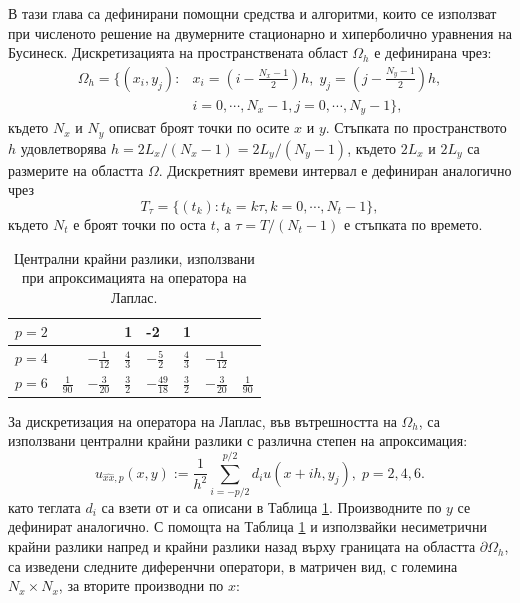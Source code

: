 \documentclass[a5paper]{article}
\newcommand{\be}{\begin{equation}}
\newcommand{\ee}{\end{equation}}
\theoremstyle{remark}
\begin{document}
\begin{large}
В тази глава са дефинирани помощни средства и алгоритми, които се използват при численото решение на двумерните стационарно и хиперболично уравнения на Бусинеск. Дискретизацията на пространствената област $\Omega_h$ е дефинирана чрез:
\begin{align}\label{Omega}
\Omega_h = \{(x_i,y_j):& x_i = (i-\frac{N_x-1}{2})h, \; y_j = (j-\frac{N_y-1}{2})h, \nonumber\\
                                   & i = 0,\cdots, N_x-1, j = 0 ,\cdots , N_y-1 \},
\end{align}
където $N_x$ и $N_y$ описват броят точки по осите $x$ и $y$. Стъпката по пространството $h$ удовлетворява $h =2 L_x/(N_x-1) =2 L_y/(N_y-1)$, където $2 L_x$ и $2 L_y$ са размерите на областта $\Omega$. Дискретният времеви интервал е дефиниран аналогично чрез
\be
T_{\tau} = \{(t_k): t_k = k\tau, k = 0,\cdots ,N_t-1 \},
\ee
където $N_t$ е броят точки по оста $t$, а $\tau = T/(N_t-1)$ е стъпката по времето.
\begin{table}[ht]
\centering
\small
		\begin{tabular}{||c|l|l|l|l|l|l|l||}
			\hline
			\hline
            $p=2$          &          &                                 &     1      &   -2   &    1    &    &        \\
   			\hline 
			\hline 
           $p=4$          &                            &   $-\frac{1}{12}$     &     $\frac{4}{3}$      &   $-\frac{5}{2} $     &    $\frac{4}{3}$    &  $-\frac{1}{12}$   &        \\
	   \hline
			\hline 
            $p=6$        &   $\frac{1}{90}$       &     $-\frac{3}{20}$     &    $\frac{3}{2}$      &    $-\frac{49}{18}$   &    $\frac{3}{2}$    & $-\frac{3}{20}$    &    $\frac{1}{90}$       \\
	   \hline
			\hline 
		\end{tabular}
	\caption{Централни крайни разлики, използвани при апроксимацията на оператора на Лаплас.}
	\label{table:A00}
\end{table}
За дискретизация на оператора на Лаплас, във вътрешността на $\Omega_h$, са използвани централни крайни разлики с различна степен на апроксимация:
\begin{equation}\label{fdx}
u_{\widehat{xx},p}(x,y) :=  \frac{1}{h^2} \sum\limits_{i=-p/2}^{p/2} d_i u(x+ih, y_j), \; p=2,4,6.
\end{equation}
като теглата $d_i$ са взети от \cite{forn} и са описани в Таблица \ref{table:A00}. Производните по $y$ се дефинират аналогично. С помощта на Таблица \ref{table:A00} и използвайки несиметрични крайни разлики напред и крайни разлики назад върху границата на областта $\partial \Omega_h$, са изведени следните диференчни оператори, в матричен вид, с големина $N_x \times N_x$, за вторите производни по $x$:

\end{large}
\end{document}
